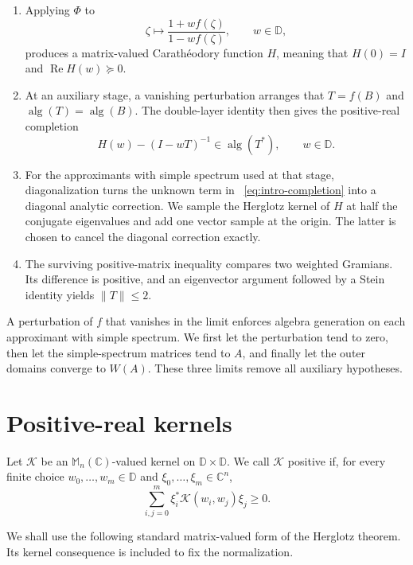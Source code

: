 \documentclass[preprints,article,submit,oneauthor]{Definitions/mdpi}
\theoremstyle{mdpi}
\theoremstyle{definition}
\newcommand{\C}{\mathbb C}
\newcommand{\D}{\mathbb D}
\newcommand{\Mn}{\mathbb M_n(\C)}
\newcommand{\alg}{\operatorname{alg}}
\newcommand{\RePart}{\operatorname{Re}}
\begin{document}
\begin{enumerate}
\item Applying $\Phi$ to
\[
  \zeta\longmapsto\frac{1+w f(\zeta)}{1-w f(\zeta)},
  \qquad w\in\D,
\]
produces a matrix-valued Carath\'eodory function $H$, meaning that
$H(0)=I$ and $\RePart H(w)\succeq0$.

\item At an auxiliary stage, a vanishing perturbation arranges that
$T=f(B)$ and $\alg(T)=\alg(B)$.  The double-layer identity then gives
the positive-real completion
\begin{equation}
  H(w)-(I-wT)^{-1}\in\alg(T^*),\qquad w\in\D.
  \label{eq:intro-completion}
\end{equation}

\item For the approximants with simple spectrum used at that stage,
diagonalization turns the unknown term in~%
\eqref{eq:intro-completion} into a diagonal analytic correction.  We
sample the Herglotz kernel of $H$ at half the conjugate eigenvalues and
add one vector sample at the origin.  The latter is chosen to cancel
the diagonal correction exactly.

\item The surviving positive-matrix inequality compares two weighted
Gramians.  Its difference is positive, and an eigenvector argument
followed by a Stein identity yields $\lVert T\rVert\leq2$.
\end{enumerate}

A perturbation of $f$ that vanishes in the limit enforces algebra
generation on each approximant with simple spectrum.  We first let the
perturbation tend to zero, then let the simple-spectrum matrices tend to
$A$, and finally let the outer domains converge to $W(A)$.  These three
limits remove all auxiliary hypotheses.

\section{Positive-real kernels}
\label{sec:herglotz}

Let $\mathcal K$ be an $\Mn$-valued kernel on $\D\times\D$.  We call
$\mathcal K$ positive if, for every finite choice
$w_0,\ldots,w_m\in\D$ and $\xi_0,\ldots,\xi_m\in\C^n$,
\begin{equation}
  \sum_{i,j=0}^m
  \xi_i^*\mathcal K(w_i,w_j)\xi_j\geq0.
  \label{eq:positive-kernel-definition}
\end{equation}

We shall use the following standard matrix-valued form of the Herglotz
theorem.  Its kernel consequence is included to fix the normalization.
\end{document}
